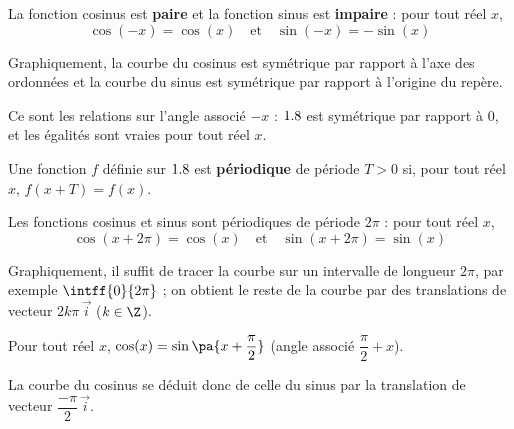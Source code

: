 \begin{propriete}[Parité]
	La fonction cosinus est \textbf{paire} et la fonction sinus est \textbf{impaire} : pour tout réel $x$,
	\[
		\cos(-x) = \cos(x) \quad \text{et} \quad \sin(-x) = -\sin(x)
	\]

	Graphiquement, la courbe du cosinus est symétrique par rapport à l'axe des ordonnées et la courbe du sinus est symétrique par rapport à l'origine du repère.
\end{propriete}

\begin{demonstration}
	Ce sont les relations sur l'angle associé $-x$ : $1.8$ est symétrique par rapport à $0$, et les égalités sont vraies pour tout réel $x$.
\end{demonstration}

\newpage

\begin{defin}
	Une fonction $f$ définie sur $1.8$ est \textbf{périodique} de période $T > 0$ si, pour tout réel $x$, $f(x + T) = f(x)$.
\end{defin}

\begin{propriete}[Périodicité]
	Les fonctions cosinus et sinus sont périodiques de période $2\pi$ : pour tout réel $x$,
	\[
		\cos(x + 2\pi) = \cos(x) \quad \text{et} \quad \sin(x + 2\pi) = \sin(x)
	\]

	Graphiquement, il suffit de tracer la courbe sur un intervalle de longueur $2\pi$, par exemple $\intff{0}{2\pi}$ ; on obtient le reste de la courbe par des translations de vecteur $2k\pi\,\vec{i}$ ($k \in \Z$).
\end{propriete}

\begin{rem}
	Pour tout réel $x$, $\cos(x) = \sin\pa{x + \dfrac{\pi}{2}}$ (angle associé $\dfrac{\pi}{2} + x$).

	La courbe du cosinus se déduit donc de celle du sinus par la translation de vecteur $\dfrac{-\pi}{2}\,\vec{i}$.
\end{rem}

